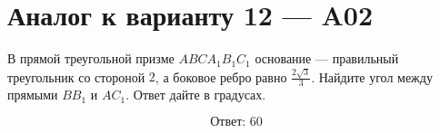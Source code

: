 \documentclass[12pt,a4paper]{article}
\begin{document}
\section*{Аналог к варианту 12 — A02}

В прямой треугольной призме \(ABCA_1B_1C_1\) основание — правильный треугольник со стороной \(2\), а боковое ребро равно \(\frac{2\sqrt3}{3}\). Найдите угол между прямыми \(BB_1\) и \(AC_1\). Ответ дайте в градусах.

\begin{center}
\end{center}

\[
\boxed{\text{Ответ: }60}
\]
\end{document}
